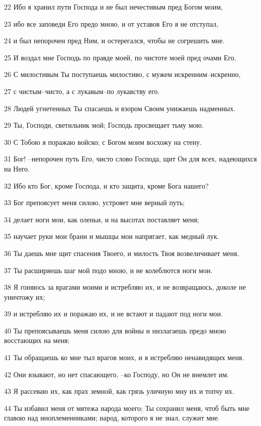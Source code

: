 \par 22 Ибо я хранил пути Господа и не был нечестивым пред Богом моим,
\par 23 ибо все заповеди Его предо мною, и от уставов Его я не отступал,
\par 24 и был непорочен пред Ним, и остерегался, чтобы не согрешить мне.
\par 25 И воздал мне Господь по правде моей, по чистоте моей пред очами Его.
\par 26 С милостивым Ты поступаешь милостиво, с мужем искренним--искренно,
\par 27 с чистым--чисто, а с лукавым--по лукавству его.
\par 28 Людей угнетенных Ты спасаешь и взором Своим унижаешь надменных.
\par 29 Ты, Господи, светильник мой; Господь просвещает тьму мою.
\par 30 С Тобою я поражаю войско; с Богом моим восхожу на стену.
\par 31 Бог! --непорочен путь Его, чисто слово Господа, щит Он для всех, надеющихся на Него.
\par 32 Ибо кто Бог, кроме Господа, и кто защита, кроме Бога нашего?
\par 33 Бог препоясует меня силою, устрояет мне верный путь;
\par 34 делает ноги мои, как оленьи, и на высотах поставляет меня;
\par 35 научает руки мои брани и мышцы мои напрягает, как медный лук.
\par 36 Ты даешь мне щит спасения Твоего, и милость Твоя возвеличивает меня.
\par 37 Ты расширяешь шаг мой подо мною, и не колеблются ноги мои.
\par 38 Я гоняюсь за врагами моими и истребляю их, и не возвращаюсь, доколе не уничтожу их;
\par 39 и истребляю их и поражаю их, и не встают и падают под ноги мои.
\par 40 Ты препоясываешь меня силою для войны и низлагаешь предо мною восстающих на меня;
\par 41 Ты обращаешь ко мне тыл врагов моих, и я истребляю ненавидящих меня.
\par 42 Они взывают, но нет спасающего, --ко Господу, но Он не внемлет им.
\par 43 Я рассеваю их, как прах земной, как грязь уличную мну их и топчу их.
\par 44 Ты избавил меня от мятежа народа моего; Ты сохранил меня, чтоб быть мне главою над иноплеменниками; народ, которого я не знал, служит мне.
